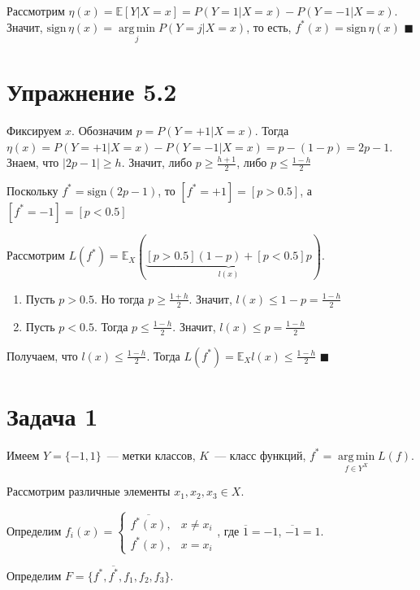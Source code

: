 \documentclass[a4paper]{article}
\DeclareMathOperator*{\argmin}{arg\,min}
\begin{document}
Рассмотрим $\eta(x)=\mathbb{E}[Y|X=x]=P(Y=1\big|X=x)-P(Y=-1\big| X=x)$. Значит, $\mbox{sign}\,\eta(x)=\argmin\limits_j P(Y=j\big| X=x)$, то есть, $f^*(x)=\mbox{sign}\,\eta(x)$ $\blacksquare$
\section*{Упражнение 5.2}
Фиксируем $x$. Обозначим $p=P(Y=+1|X=x)$. Тогда $\eta(x)=P(Y=+1|X=x)-P(Y=-1|X=x)=p-(1-p)=2p-1$. Знаем, что $|2p-1|\geqslant h$. Значит, либо $p\geqslant\frac{h+1}{2}$, либо $p\leqslant \frac{1-h}{2}$

Поскольку $f^*=\mbox{sign}(2p-1)$, то $[f^*=+1]=[p>0.5]$, а $[f^*=-1]=[p<0.5]$

Рассмотрим $L(f^*)=\mathbb{E}_X\left(\underbrace{[p>0.5](1-p)+[p<0.5]p}_{l(x)}\right)$.

\begin{enumerate}
\item Пусть $p>0.5$. Но тогда $p\geqslant \frac{1+h}{2}$. Значит, $l(x)\leqslant 1-p=\frac{1-h}{2}$
\item Пусть $p<0.5$. Тогда $p\leqslant \frac{1-h}{2}$. Значит, $l(x)\leqslant p=\frac{1-h}{2}$
\end{enumerate}

Получаем, что $l(x)\leqslant \frac{1-h}{2}$. Тогда $L(f^*)=\mathbb{E}_Xl(x)\leqslant \frac{1-h}{2}$ $\blacksquare$
\section*{Задача 1}
Имеем $Y=\{-1,1\}$~--- метки классов, $K$~--- класс функций, $f^*=\argmin\limits_{f\in Y^X} L(f)$.

Рассмотрим различные элементы $x_1,x_2,x_3\in X$.

Определим $f_i(x)=\begin{cases}
\overline{f^*(x)},&x\neq x_i\\
f^*(x),&x=x_i
\end{cases}$, где $\overline{1}=-1$, $\overline{-1}=1$.

Определим $F=\{f^*, \overline{f^*}, f_1, f_2, f_3\}$.
\end{document}
